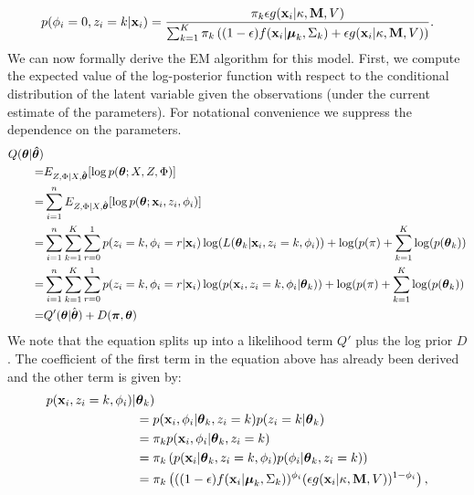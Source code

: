 \documentclass[12pt,english]{article}\usepackage[]{graphicx}\usepackage[]{color}
\begin{document}
\begin{equation}
p(\phi_i = 0, z_i = k| {\bf x}_i ) = \frac{\pi_k \epsilon g({\bf x}_i|\kappa, {\bf M}, V)}{\sum_{k=1}^{K}\pi_k\left((1-\epsilon) f({\bf x}_i|\boldsymbol{\mu}_k, \Sigma_k) + \epsilon g({\bf x}_i|\kappa, {\bf M}, V)\right)}.
\end{equation}
We can now formally derive the EM algorithm for this model. First, we compute the expected value of the log-posterior function with respect to the conditional distribution of the latent variable given the observations (under the current estimate of the parameters). For notational convenience we suppress the dependence on the parameters.
\begin{equation}
\begin{split}
Q(\boldsymbol{\theta}| \boldsymbol{\hat{\theta}}) & \\
= & E_{Z,\Phi|X, \hat{\boldsymbol{\theta}}}[\log p(\boldsymbol{\theta};X,Z,\Phi)] \\
= & \sum_{i=1}^{n} E_{Z,\Phi|X, \hat{\boldsymbol{\theta}}}[\log p(\boldsymbol{\theta}; {\bf x}_i,z_i,\phi_i)] \\
= & \sum_{i=1}^{n} \sum_{k=1}^{K}\sum_{r = 0}^{1}p(z_i = k, \phi_i = r|{\bf x}_i) \log(L(\boldsymbol{\theta}_k|{\bf x}_i, z_i = k, \phi_i))  + \log(p(\pi) + \sum_{k=1}^{K}\log(p(\boldsymbol{\theta}_k))\\
= & \sum_{i=1}^{n} \sum_{k=1}^{K}\sum_{r = 0}^{1}p(z_i = k, \phi_i = r|{\bf x}_i) \log(p({\bf x}_i, z_i = k , \phi_i|\boldsymbol{\theta}_k))  + \log(p(\pi) + \sum_{k=1}^{K}\log(p(\boldsymbol{\theta}_k))\\
= & Q'(\boldsymbol{\theta}| \hat{\boldsymbol{\theta}}) + D(\boldsymbol{\pi},\boldsymbol{\theta})
\end{split}
\end{equation}
We note that the equation splits up into a likelihood term $Q'$ plus the log prior $D$. The coefficient of the first term in the equation above has already been derived and the other term is given by:
\begin{equation}
\begin{split}
p({\bf x}_i, z_i = k , \phi_i)|&\boldsymbol{\theta}_k) \\
&=  p({\bf x}_i,\phi_i|\boldsymbol{\theta}_k,z_i=k)p(z_i=k|\boldsymbol{\theta}_k) \\
 & = \pi_k p({\bf x}_i,\phi_i|\boldsymbol{\theta}_k,z_i=k)\\
 & =\pi_k \left(p({\bf x}_i|\boldsymbol{\theta}_k,z_i=k, \phi_i)p(\phi_i|\boldsymbol{\theta}_k,z_i=k)\right)\\
 & = \pi_k \left(((1 - \epsilon)f({\bf x}_i|\boldsymbol{\mu}_k, \Sigma_k))^{\phi_i}(\epsilon g({\bf x}_i|\kappa, {\bf M}, V))^{1-\phi_i}\right),
\end{split}
\end{equation}
\end{document}
